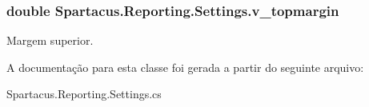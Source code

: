 \hypertarget{classSpartacus_1_1Reporting_1_1Settings_a7e12c1140d9c7606183d906f411ac21b}{
\subsubsection[{v\+\_\+topmargin}]{\setlength{\rightskip}{0pt plus 5cm}double Spartacus.\+Reporting.\+Settings.\+v\+\_\+topmargin}}\label{classSpartacus_1_1Reporting_1_1Settings_a7e12c1140d9c7606183d906f411ac21b}


Margem superior. 



A documentação para esta classe foi gerada a partir do seguinte arquivo\+:\begin{DoxyCompactItemize}
\item 
Spartacus.\+Reporting.\+Settings.\+cs\end{DoxyCompactItemize}
